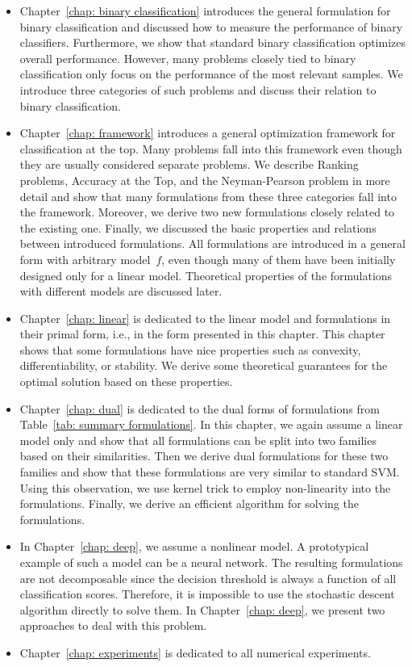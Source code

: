 \begin{itemize}
  \item Chapter~\ref{chap: binary classification} introduces the general formulation for binary classification and discussed how to measure the performance of binary classifiers. Furthermore, we show that standard binary classification optimizes overall performance. However, many problems closely tied to binary classification only focus on the performance of the most relevant samples. We introduce three categories of such problems and discuss their relation to binary classification.
  \item Chapter~\ref{chap: framework} introduces a general optimization framework for classification at the top. Many problems fall into this framework even though they are usually considered separate problems. We describe Ranking problems, Accuracy at the Top, and the Neyman-Pearson problem in more detail and show that many formulations from these three categories fall into the framework. Moreover, we derive two new formulations closely related to the existing one. Finally, we discussed the basic properties and relations between introduced formulations. All formulations are introduced in a general form with arbitrary model~$f$, even though many of them have been initially designed only for a linear model. Theoretical properties of the formulations with different models are discussed later.
  \item Chapter~\ref{chap: linear} is dedicated to the linear model and formulations in their primal form, i.e., in the form presented in this chapter. This chapter shows that some formulations have nice properties such as convexity, differentiability, or stability. We derive some theoretical guarantees for the optimal solution based on these properties.
  \item Chapter~\ref{chap: dual} is dedicated to the dual forms of formulations from Table~\ref{tab: summary formulations}. In this chapter, we again assume a linear model only and show that all formulations can be split into two families based on their similarities. Then we derive dual formulations for these two families and show that these formulations are very similar to standard SVM. Using this observation, we use kernel trick to employ non-linearity into the formulations. Finally, we derive an efficient algorithm for solving the formulations.
  \item In Chapter~\ref{chap: deep}, we assume a nonlinear model. A prototypical example of such a model can be a neural network. The resulting formulations are not decomposable since the decision threshold is always a function of all classification scores. Therefore, it is impossible to use the stochastic descent algorithm directly to solve them. In Chapter~\ref{chap: deep}, we present two approaches to deal with this problem.
  \item Chapter~\ref{chap: experiments} is dedicated to all numerical experiments.
\end{itemize}
